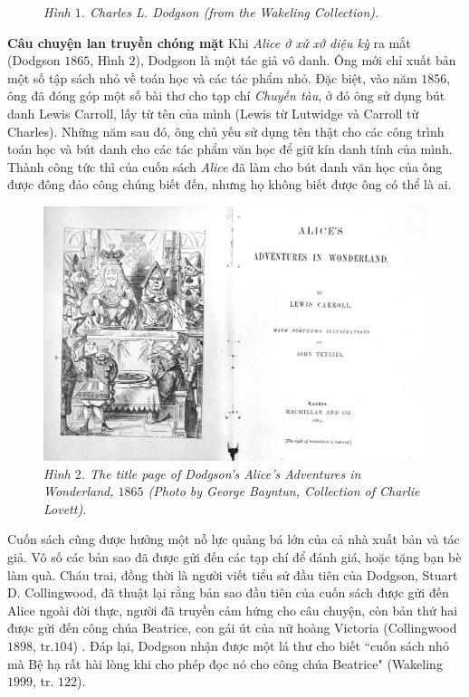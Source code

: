 \begin{multicols}{2}
\begin{figure}[H]
		\caption{\small\textit{\color{quantoan}Hình $1$. Charles L. Dodgson (from the Wakeling
				Collection).}}
		\vspace*{-5pt}
	\end{figure}
	\textbf{\color{quantoan}Câu chuyện lan truyền chóng mặt}
	\vskip 0.1cm
	Khi \textit{Alice ở xứ xở diệu kỳ} ra mắt (Dodgson $1865$, Hình $2$), Dodgson là một tác giả vô danh. Ông mới chỉ xuất bản một số tập sách nhỏ về toán học và các tác phẩm nhỏ. Đặc biệt, vào năm $1856$, ông đã đóng góp một số bài thơ cho tạp chí \textit{Chuyến tàu}, ở đó ông sử dụng bút danh Lewis Carroll, lấy từ tên của mình (Lewis từ Lutwidge và Carroll từ Charles). Những năm sau đó, ông chủ yếu sử dụng tên thật cho các công trình toán học và bút danh cho các tác phẩm văn học để giữ kín danh tính của mình. Thành công tức thì của cuốn sách \textit{Alice} đã làm cho bút danh văn học của ông được đông đảo công chúng biết đến, nhưng họ không biết được ông có thể là ai.
	\begin{figure}[H]
		\vspace*{-5pt}
		\centering
		\captionsetup{labelformat= empty, justification=centering}
		\includegraphics[width= 1\linewidth]{2}
		\caption{\small\textit{\color{quantoan}Hình $2$. The title page of Dodgson’s Alice’s Adventures in Wonderland, $1865$ (Photo by George Bayntun, Collection of Charlie Lovett).}}
		\vspace*{-10pt}
	\end{figure}
	Cuốn sách cũng được hưởng một nỗ lực quảng bá lớn của cả nhà xuất bản và tác giả. Vô số các bản sao đã được gửi đến các tạp chí để đánh giá, hoặc tặng bạn bè làm quà. Cháu trai, đồng thời là người viết tiểu sử đầu tiên của Dodgson, Stuart D. Collingwood, đã thuật lại rằng bản sao đầu tiên của cuốn sách được gửi đến Alice ngoài đời thực, người đã truyền cảm hứng cho câu chuyện, còn bản thứ hai được gửi đến công chúa Beatrice, con gái út của nữ hoàng Victoria (Collingwood $1898$, tr.$104$) . Đáp lại, Dodgson nhận được một lá thư cho biết ``cuốn sách nhỏ mà Bệ hạ rất hài lòng khi cho phép đọc nó cho công chúa Beatrice" (Wakeling $1999$, tr. $122$).

\end{multicols}
